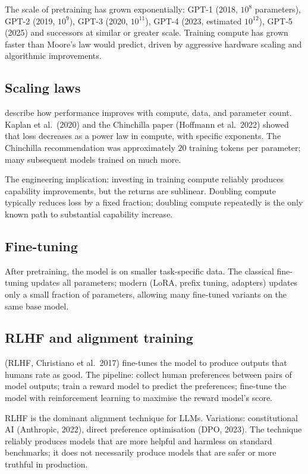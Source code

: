 The scale of pretraining has grown exponentially: GPT-1 (2018, $10^8$ parameters), GPT-2 (2019, $10^9$), GPT-3 (2020, $10^{11}$), GPT-4 (2023, estimated $10^{12}$), GPT-5 (2025) and successors at similar or greater scale. Training compute has grown faster than Moore's law would predict, driven by aggressive hardware scaling and algorithmic improvements.

\subsection{Scaling laws}

 describe how performance improves with compute, data, and parameter count. Kaplan et al.\ (2020) and the Chinchilla paper (Hoffmann et al.\ 2022) showed that loss decreases as a power law in compute, with specific exponents. The Chinchilla recommendation was approximately $20$ training tokens per parameter; many subsequent models trained on much more.

The engineering implication: investing in training compute reliably produces capability improvements, but the returns are sublinear. Doubling compute typically reduces loss by a fixed fraction; doubling compute repeatedly is the only known path to substantial capability increase.

\subsection{Fine-tuning}

After pretraining, the model is  on smaller task-specific data. The classical fine-tuning updates all parameters; modern  (LoRA, prefix tuning, adapters) updates only a small fraction of parameters, allowing many fine-tuned variants on the same base model.

\subsection{RLHF and alignment training}

 (RLHF, Christiano et al.\ 2017) fine-tunes the model to produce outputs that humans rate as good. The pipeline: collect human preferences between pairs of model outputs; train a reward model to predict the preferences; fine-tune the model with reinforcement learning to maximise the reward model's score.

RLHF is the dominant alignment technique for LLMs. Variations: constitutional AI (Anthropic, 2022), direct preference optimisation (DPO, 2023). The technique reliably produces models that are more helpful and harmless on standard benchmarks; it does not necessarily produce models that are safer or more truthful in production.


